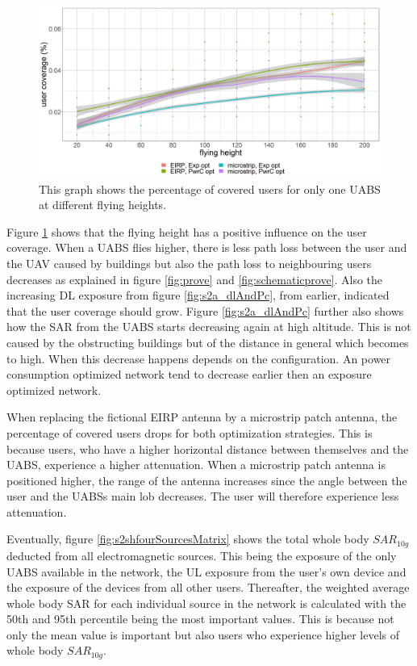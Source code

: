 \begin{figure}[h]
  \includegraphics[width=\textwidth]{../results/s2/fhvscov.png}
  \caption{This graph shows the percentage of covered users for only one \gls{UABS} at different flying heights.}
  \label{fig:s2fhvscov}
\end{figure}

Figure  \ref{fig:s2fhvscov} shows that the flying height has a positive influence on the user coverage. 
When a \gls{UABS} flies higher, there is less path loss between the user and the \gls{UAV} caused by buildings but also the path loss to neighbouring 
users decreases as explained 
in figure \ref{fig:prove} and \ref{fig:schematicprove}. 
Also the increasing \gls{DL} exposure  from figure \ref{fig:s2a_dlAndPc}, from earlier, indicated that the
user coverage should grow. 
Figure \ref{fig:s2a_dlAndPc} further also shows how the \gls{SAR} from the \gls{UABS}
starts  decreasing again at high altitude. This is  not caused by the obstructing buildings but of the 
distance in general which becomes to high.  When this decrease happens depends on the configuration.  An power consumption optimized 
network tend to decrease earlier then an exposure optimized network.


When replacing the fictional \gls{EIRP} antenna by a microstrip patch antenna, the percentage of covered users drops for both 
optimization strategies. This is because users, who have a higher horizontal distance between themselves and the \gls{UABS}, 
experience a higher attenuation. When a microstrip patch antenna is positioned higher, the range of the antenna increases 
since the angle between the user and the \gls{UABS}s main lob decreases. The user will therefore experience less attenuation.

Eventually, figure \ref{fig:s2shfourSourcesMatrix} shows the total whole body $SAR_{10g}$ deducted from all electromagnetic sources. This being the exposure 
of the only \gls{UABS} available in the network, 
 the \gls{UL} exposure from the user’s own device and the exposure of the devices from all other users. 
 Thereafter, the weighted average whole body \gls{SAR} for each individual source in the network is calculated with the 50th and 95th percentile 
 being the most important values. This is because not only the mean value is important but also users who experience higher 
 levels of whole body $SAR_{10g}$.


